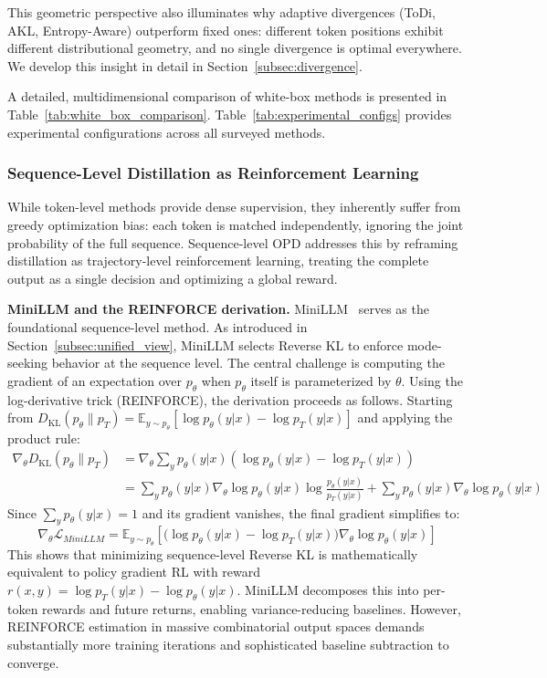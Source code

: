 \documentclass{article} %
\newcommand{\KL}{D_{\mathrm{KL}}}
\newcommand{\ptheta}{p_\theta}
\newcommand{\pteacher}{p_T}
\begin{document}
This geometric perspective also illuminates why adaptive divergences (ToDi, AKL, Entropy-Aware) outperform fixed ones: different token positions exhibit different distributional geometry, and no single divergence is optimal everywhere. We develop this insight in detail in Section~\ref{subsec:divergence}.

A detailed, multidimensional comparison of white-box methods is presented in Table~\ref{tab:white_box_comparison}. Table~\ref{tab:experimental_configs} provides experimental configurations across all surveyed methods.


\subsubsection{Sequence-Level Distillation as Reinforcement Learning}

\label{subsec:sequence_level}

While token-level methods provide dense supervision, they inherently suffer from greedy optimization bias: each token is matched independently, ignoring the joint probability of the full sequence. Sequence-level OPD addresses this by reframing distillation as trajectory-level reinforcement learning, treating the complete output as a single decision and optimizing a global reward.

\textbf{MiniLLM and the REINFORCE derivation.}
MiniLLM~\citep{2306.08543} serves as the foundational sequence-level method. As introduced in Section~\ref{subsec:unified_view}, MiniLLM selects Reverse KL to enforce mode-seeking behavior at the sequence level. The central challenge is computing the gradient of an expectation over $\ptheta$ when $\ptheta$ itself is parameterized by $\theta$. Using the log-derivative trick (REINFORCE), the derivation proceeds as follows. Starting from $\KL(\ptheta \parallel \pteacher) = \mathbb{E}_{y \sim \ptheta} [ \log \ptheta(y|x) - \log \pteacher(y|x) ]$ and applying the product rule:
{\small\begin{align}
    \nabla_\theta \KL(\ptheta \| \pteacher) &= \nabla_\theta \sum_y \ptheta(y|x) \left( \log \ptheta(y|x) - \log \pteacher(y|x) \right) \nonumber \\
    &= \sum_y \ptheta(y|x) \nabla_\theta \log \ptheta(y|x) \log \frac{\ptheta(y|x)}{\pteacher(y|x)} + \sum_y \ptheta(y|x) \nabla_\theta \log \ptheta(y|x)
\end{align}}
Since $\sum_y \ptheta(y|x) = 1$ and its gradient vanishes, the final gradient simplifies to:
\begin{equation}
    \nabla_\theta \mathcal{L}_{MiniLLM} = \mathbb{E}_{y \sim \ptheta} \left[ \Big( \log \ptheta(y|x) - \log \pteacher(y|x) \Big) \nabla_\theta \log \ptheta(y|x) \right]
    \label{eq:minillm_final}
\end{equation}
This shows that minimizing sequence-level Reverse KL is mathematically equivalent to policy gradient RL with reward $r(x,y) = \log \pteacher(y|x) - \log \ptheta(y|x)$. MiniLLM decomposes this into per-token rewards and future returns, enabling variance-reducing baselines. However, REINFORCE estimation in massive combinatorial output spaces demands substantially more training iterations and sophisticated baseline subtraction to converge.
\end{document}

